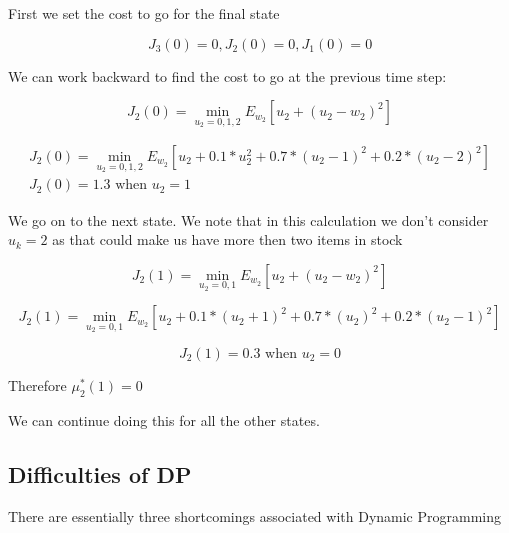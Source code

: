 \documentclass[twoside]{article}
\begin{document}
First we set the cost to go for the final state

$$ 
J_{3}(0)=0, J_{2}(0)=0, J_{1}(0)=0
 $$

We can work backward to find the cost to go at the previous time step:

$$ 
J_{2}(0)=\min _{u_{2}=0,1,2} E_{w_{2}}\left[u_{2}+\left(u_{2}-w_{2}\right)^{2}\right]
 $$
 
 $$ 
\begin{array}{c}{J_{2}(0)=\min _{u_{2}=0,1,2} E_{w_{2}}\left[u_{2}+0.1 * u_{2}^{2}+0.7 *\left(u_{2}-1\right)^{2}+0.2 *\left(u_{2}-2\right)^{2}\right]} \\

{J_{2}(0)=1.3 \text { when } u_{2}=1}\end{array}
 $$

We go on to the next state. We note that in this calculation we don’t consider $u_k = 2$ as that could make us have more then two items in stock

$$ 
J_{2}(1)=\min _{u_{2}=0,1} E_{w_{2}}\left[u_{2}+\left(u_{2}-w_{2}\right)^{2}\right]
 $$

$$ 
J_{2}(1)=\min _{u_{2}=0,1} E_{w_{2}}\left[u_{2}+0.1 *\left(u_{2}+1\right)^{2}+0.7 *\left(u_{2}\right)^{2}+0.2 *\left(u_{2}-1\right)^{2}\right]
$$
 
$$ 
J_{2}(1)=0.3 \text { when } u_{2}=0
$$

Therefore $\mu_{2}^*(1) = 0$

We can continue doing this for all the other states.

\subsection{Difficulties of DP}
There are essentially three shortcomings associated with Dynamic Programming
\end{document}

